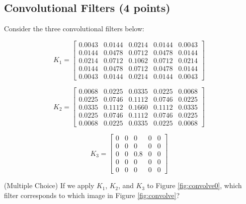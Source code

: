 

\newpage

\subsection{Convolutional Filters (4 points)}


Consider the three convolutional filters below:

\begin{small}
\[K_{1} = \begin{bmatrix}
0.0043 & 0.0144 & 0.0214 & 0.0144 & 0.0043 \\
0.0144 & 0.0478 & 0.0712 & 0.0478 & 0.0144 \\
0.0214 & 0.0712 & 0.1062 & 0.0712 & 0.0214 \\
0.0144 & 0.0478 & 0.0712 & 0.0478 & 0.0144 \\
0.0043 & 0.0144 & 0.0214 & 0.0144 & 0.0043 
\end{bmatrix}\]

\[K_{2} = \begin{bmatrix}
0.0068 & 0.0225 & 0.0335 & 0.0225 & 0.0068 \\
0.0225 & 0.0746 & 0.1112 & 0.0746 & 0.0225 \\
0.0335 & 0.1112 & 0.1660 & 0.1112 & 0.0335 \\
0.0225 & 0.0746 & 0.1112 & 0.0746 & 0.0225 \\
0.0068 & 0.0225 & 0.0335 & 0.0225 & 0.0068 
\end{bmatrix}\]

\[K_{3} = \begin{bmatrix}
0 & 0 & 0 & 0 & 0\\
0 & 0 & 0 & 0 & 0\\
0 & 0 & 0.8 & 0 & 0\\
0 & 0 & 0 & 0 & 0\\
0 & 0 & 0 & 0 & 0
\end{bmatrix}\]
\end{small}

\question (Multiple Choice) If we apply $K_1$, $K_2$, and $K_3$ to Figure \ref{fig:convolve0}, which filter corresponds to which  image in Figure \ref{fig:convolve}?

\smallskip


